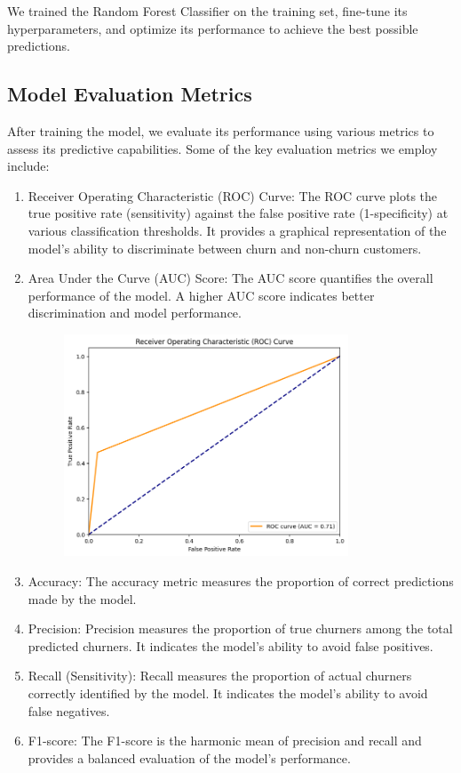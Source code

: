 \documentclass[11pt,a4paper]{article}
\begin{document}
We trained the Random Forest Classifier on the training set, fine-tune its hyperparameters, and optimize its performance to achieve the best possible predictions.

\subsection{Model Evaluation Metrics}

After training the model, we evaluate its performance using various metrics to assess its predictive capabilities. Some of the key evaluation metrics we employ include: 

\begin{enumerate}
    \item Receiver Operating Characteristic (ROC) Curve: The ROC curve plots the true positive rate (sensitivity) against the false positive rate (1-specificity) at various classification thresholds. It provides a graphical representation of the model's ability to discriminate between churn and non-churn customers.

    \item Area Under the Curve (AUC) Score: The AUC score quantifies the overall performance of the model. A higher AUC score indicates better discrimination and model performance.
    
\begin{figure}[H]
    \centering
    \includegraphics[width=0.8\textwidth]{ROC Curve.png}
\end{figure}


    \item Accuracy: The accuracy metric measures the proportion of correct predictions made by the model.
    \item Precision: Precision measures the proportion of true churners among the total predicted churners. It indicates the model's ability to avoid false positives.
    \item Recall (Sensitivity): Recall measures the proportion of actual churners correctly identified by the model. It indicates the model's ability to avoid false negatives.
    \item F1-score: The F1-score is the harmonic mean of precision and recall and provides a balanced evaluation of the model's performance.


\end{enumerate}
\end{document}
